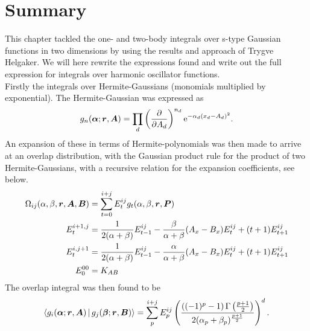 \section{Summary\label{sec:basis_summary}}
    This chapter tackled the one- and two-body integrals over s-type Gaussian
    functions in two dimensions by using the results and approach of Trygve
    Helgaker. We will here rewrite the expressions found and write out the full
    expression for integrals over harmonic oscillator functions. \\

    Firstly the integrals over Hermite-Gaussians (monomials multiplied by
    exponential). The Hermite-Gaussian was expressed as 
        \begin{equation}
            g_n(\boldsymbol{{\alpha}};\boldsymbol{{r}},\boldsymbol{{A}}) = \prod_d
            \left(\frac{\mathrm{\partial}}{\mathrm{\partial} A_d}\right)^{n_d} \mathrm{e}^{-\alpha_d(x_d-A_d)^2}.
            \label{eq:HGsumdef}
        \end{equation}
    An expansion of these in terms of Hermite-polynomials was then made to
    arrive at an overlap distribution, with the Gaussian product rule for the
    product of two Hermite-Gaussians, with a recursive relation for the
    expansion coefficients, see  below.
        \begin{equation}
            \begin{aligned}
                \Omega_{ij}(\alpha,\beta,\boldsymbol{{r}},\boldsymbol{{A}},\boldsymbol{{B}}) &=
                \sum\limits^{i+j}_{t=0}
                E^{ij}_tg_t(\alpha,\beta,\boldsymbol{{r}},\boldsymbol{{P}}) \\
                E^{i+1,j}_t &= \frac{1}{2(\alpha + \beta)}E^{ij}_{t-1} -
                \frac{\beta}{\alpha+\beta}(A_x - B_x)E^{ij}_t +
                (t+1)E^{ij}_{t+1} \\
                E^{i,j+1}_t &= \frac{1}{2(\alpha + \beta)}E^{ij}_{t-1} -
                \frac{\alpha}{\alpha+\beta}(A_x - B_x)E^{ij}_t +
                (t+1)E^{ij}_{t+1} \\
                E^{00}_0 &= K_{AB}
            \end{aligned}
            \label{overlapdistdefsum}
        \end{equation}
    The overlap integral was then found to be
        \begin{equation}
            \Braket{g_i(\boldsymbol{{\alpha}};\boldsymbol{{r}},\boldsymbol{{A}}) |
            g_j(\boldsymbol{{\beta}};\boldsymbol{{r}},\boldsymbol{{B}})} = \sum\limits^{i+j}_{p} E^{ij}_{p}
            \left(\frac{\left((-1)^p-1\right)\Gamma\left(\frac{p+1}{2}\right)}
            {2(\alpha_p+\beta_p)^{\frac{p+1}{2}}}\right)^d.
            \label{eq:overlapintdefsum}
        \end{equation}
